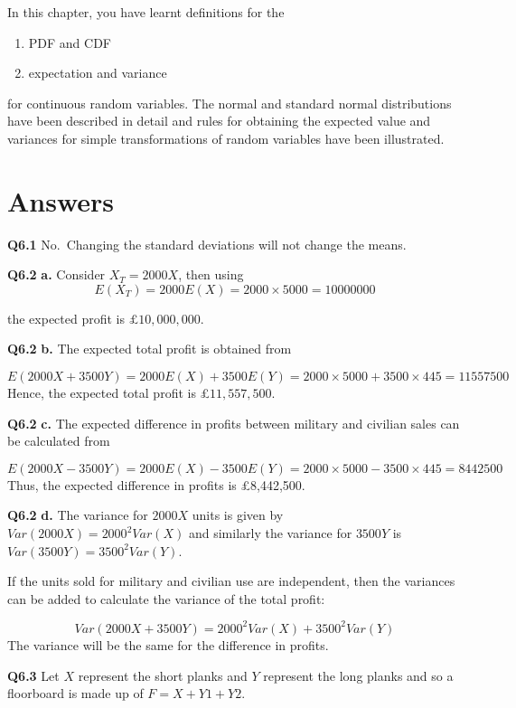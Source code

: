 \documentclass[
  oneside]{krantz}
\begin{document}
In this chapter, you have learnt definitions for the

\begin{enumerate}
\def\labelenumi{\arabic{enumi}.}
\item
  PDF and CDF
\item
  expectation and variance
\end{enumerate}

for continuous random variables. The normal and standard normal distributions have been described in detail and rules for obtaining the expected value and variances for simple transformations of random variables have been illustrated.

\hypertarget{ANScontrv}{%
\section{Answers}\label{ANScontrv}}

\textbf{Q6.1} No.~Changing the standard deviations will not change the means.

\textbf{Q6.2} \textbf{a.} Consider \(X_T = 2000X\), then using
\[E(X_T) = 2000E(X) = 2000 \times 5000 = 10000000\]

the expected profit is \(\pounds 10,000,000\).

\textbf{Q6.2} \textbf{b.} The expected total profit is obtained from

\[ E(2000X+3500Y) = 2000E(X) + 3500E(Y) = 2000 \times 5000 + 3500 \times 445 = 11557500 \]
Hence, the expected total profit is £\(11,557,500\).

\textbf{Q6.2} \textbf{c.} The expected difference in profits between military and civilian sales can be calculated from

\[E(2000X - 3500Y) = 2000E(X) - 3500E(Y) = 2000 \times 5000 - 3500 \times 445 = 8442500\]
Thus, the expected difference in profits is £8,442,500.

\textbf{Q6.2} \textbf{d.} The variance for \(2000X\) units is given by \(Var(2000X) = 2000^2Var(X)\) and similarly the variance for \(3500Y\) is \(Var(3500Y) = 3500^2Var(Y)\).

If the units sold for military and civilian use are independent, then the variances can be added to calculate the variance of the total profit:

\[Var(2000X + 3500Y) = 2000^2Var(X) + 3500^2Var(Y)\]
The variance will be the same for the difference in profits.

\textbf{Q6.3} Let \(X\) represent the short planks and \(Y\) represent the long planks and so a floorboard is made up of \(F = X + Y1 + Y2\).
\end{document}
